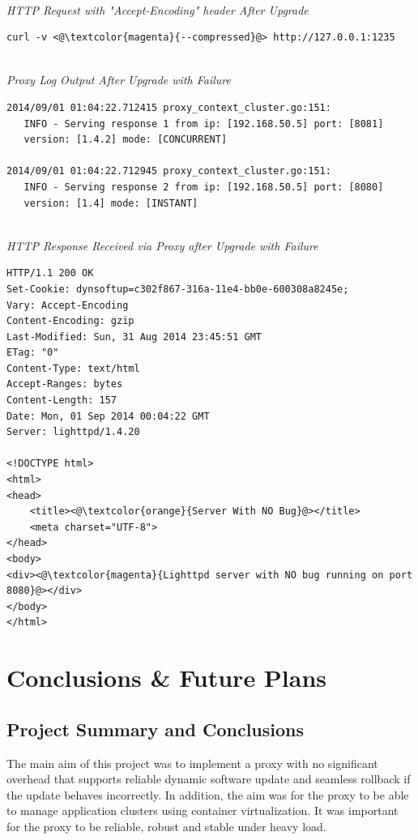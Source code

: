 \documentclass[a4paper,11pt,twoside]{report}
\begin{document}
\noindent \\
\textit{HTTP Request with "Accept-Encoding" header After Upgrade} 
\begin{lstlisting}[language=terminal]
curl -v <@\textcolor{magenta}{--compressed}@> http://127.0.0.1:1235 
\end{lstlisting}  

\noindent \\
\textit{Proxy Log Output After Upgrade with Failure}
\begin{lstlisting}[language=terminal]
2014/09/01 01:04:22.712415 proxy_context_cluster.go:151:     
   INFO - Serving response 1 from ip: [192.168.50.5] port: [8081] 
   version: [1.4.2] mode: [CONCURRENT]
   
2014/09/01 01:04:22.712945 proxy_context_cluster.go:151:     
   INFO - Serving response 2 from ip: [192.168.50.5] port: [8080] 
   version: [1.4] mode: [INSTANT]
\end{lstlisting} 

\noindent\\
\textit{HTTP Response Received via Proxy after Upgrade with Failure}  
\begin{lstlisting}[language=terminal]
HTTP/1.1 200 OK
Set-Cookie: dynsoftup=c302f867-316a-11e4-bb0e-600308a8245e;
Vary: Accept-Encoding
Content-Encoding: gzip
Last-Modified: Sun, 31 Aug 2014 23:45:51 GMT
ETag: "0"
Content-Type: text/html
Accept-Ranges: bytes
Content-Length: 157
Date: Mon, 01 Sep 2014 00:04:22 GMT
Server: lighttpd/1.4.20
 
<!DOCTYPE html>
<html>
<head>
    <title><@\textcolor{orange}{Server With NO Bug}@></title>
    <meta charset="UTF-8">
</head>
<body>
<div><@\textcolor{magenta}{Lighttpd server with NO bug running on port 8080}@></div>
</body>
</html>
\end{lstlisting} 




\clearpage



\chapter{Conclusions \& Future Plans}

\section{Project Summary and Conclusions}
The main aim of this project was to implement a  proxy with no significant overhead that supports reliable dynamic software update and seamless rollback if the update behaves incorrectly. In addition, the aim was for the proxy to be able to manage application clusters using container virtualization.  It was important for the proxy to be reliable, robust and stable under heavy load.
\end{document}
